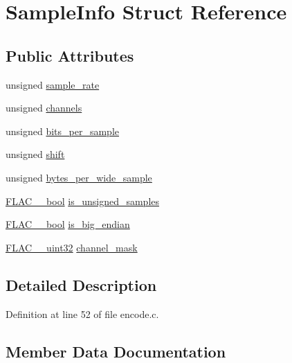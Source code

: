 \hypertarget{struct_sample_info}{}\section{Sample\+Info Struct Reference}
\label{struct_sample_info}
\subsection*{Public Attributes}
\begin{DoxyCompactItemize}
\item 
unsigned \hyperlink{struct_sample_info_ad91f85275cc07ecb93546c9bdfe7d9a8}{sample\+\_\+rate}
\item 
unsigned \hyperlink{struct_sample_info_ac45ab41db76f3c00da8f251688c4ef61}{channels}
\item 
unsigned \hyperlink{struct_sample_info_a81cea16f77d5531faa6c5ccd1f03557d}{bits\+\_\+per\+\_\+sample}
\item 
unsigned \hyperlink{struct_sample_info_a1551ef914836533ba597e7789733cfd7}{shift}
\item 
unsigned \hyperlink{struct_sample_info_aa119c89d126596b5a6e1f334a5424337}{bytes\+\_\+per\+\_\+wide\+\_\+sample}
\item 
\hyperlink{ordinals_8h_a95103469f1cbd78b8cf250194985b34e}{F\+L\+A\+C\+\_\+\+\_\+bool} \hyperlink{struct_sample_info_a54453a38a287382a8cb9da32f00694ae}{is\+\_\+unsigned\+\_\+samples}
\item 
\hyperlink{ordinals_8h_a95103469f1cbd78b8cf250194985b34e}{F\+L\+A\+C\+\_\+\+\_\+bool} \hyperlink{struct_sample_info_a3dce927697c69c2ea0e1212e28a23998}{is\+\_\+big\+\_\+endian}
\item 
\hyperlink{ordinals_8h_a9c4005ea7ef8d564b0cc993cdd0e4e5e}{F\+L\+A\+C\+\_\+\+\_\+uint32} \hyperlink{struct_sample_info_ae709550399925e097e2db55005bf1220}{channel\+\_\+mask}
\end{DoxyCompactItemize}


\subsection{Detailed Description}


Definition at line 52 of file encode.\+c.



\subsection{Member Data Documentation}
